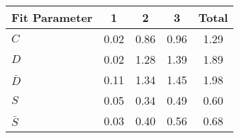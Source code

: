\begin{tabular}{l  c  c  c  c }
\hline
Fit Parameter & 1 & 2 & 3 &  Total  \\ 
\hline
\hline
$C$ & 0.02 & 0.86 & 0.96 & 1.29 \\ 
$D$ & 0.02 & 1.28 & 1.39 & 1.89 \\ 
$\bar{D}$ & 0.11 & 1.34 & 1.45 & 1.98 \\ 
$S$ & 0.05 & 0.34 & 0.49 & 0.60 \\ 
$\bar{S}$ & 0.03 & 0.40 & 0.56 & 0.68 \\ 
\hline
\end{tabular}

